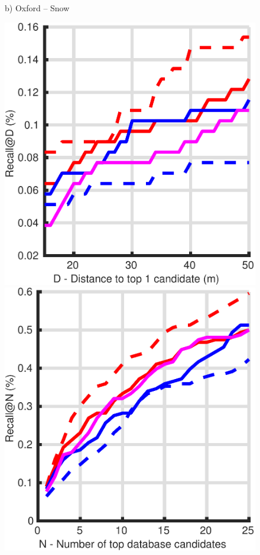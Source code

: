 \begin{figure}
\begin{minipage}{0.16\linewidth}
		b) Oxford -- Snow
	\end{minipage}
	\begin{minipage}{0.16\linewidth}
		\center \scriptsize
		\includegraphics[width=\linewidth]{plot/oxf_cmu/Results_night_queries/distance}	
		
		\includegraphics[width=\linewidth]{plot/oxf_cmu/Results_night_queries/recall}
		

\end{minipage}
\end{figure}
